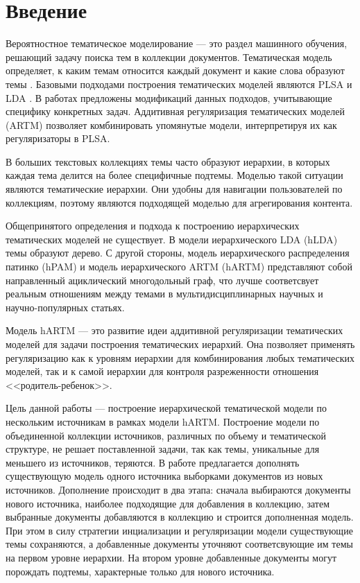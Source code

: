\chapter{Введение}
Вероятностное тематическое моделирование --- это  раздел машинного обучения, решающий задачу поиска тем в коллекции документов. Тематическая модель определяет, к каким темам относится каждый документ и какие слова образуют темы \cite{Blei2012}. Базовыми подходами построения тематических моделей являются PLSA \cite{PLSA} и LDA \cite{LDA}. В работах \cite{extLDA1,extLDA2, extLDA3} предложены модификаций данных подходов, учитывающие специфику конкретных задач. Аддитивная регуляризация тематических
моделей (ARTM)\cite{ARTM1, ARTM2, ARTM3, ARTM4, Vorontsov2014} позволяет комбинировать упомянутые модели, интерпретируя их как регуляризаторы в PLSA. 


В больших текстовых коллекциях темы часто образуют иерархии, в которых каждая тема делится на более специфичные подтемы. Моделью такой ситуации являются тематические иерархии. Они удобны для навигации пользователей по коллекциям, поэтому являются подходящей моделью для агрегирования контента.

Общепринятого определения и подхода к построению иерархических тематических моделей не существует. В модели иерархического LDA (hLDA) \cite{hLDA} темы образуют дерево. С другой стороны, модель иерархического распределения патинко (hPAM)\cite{hPAM} и модель иерархического ARTM (hARTM) \cite{hARTM} представляют собой направленный ациклический многодольный граф, что лучше соответсвует реальным отношениям между темами в мультидисциплинарных научных и научно-популярных статьях.

Модель hARTM --- это развитие идеи аддитивной регуляризации тематических моделей для задачи построения тематических иерархий.
Она позволяет применять регуляризацию как к уровням иерархии для комбинирования любых тематических моделей, так и к самой иерархии для контроля разреженности отношения <<родитель-ребенок>>.

Цель данной работы --- построение иерархической тематической модели по нескольким источникам в рамках модели hARTM. Построение модели по объединенной коллекции источников, различных по объему и тематической структуре, не решает поставленной задачи, так как темы, уникальные для меньшего из источников, теряются. В работе предлагается дополнять существующую модель одного источника выборками документов из новых источников. Дополнение происходит в два этапа: сначала выбираются документы нового источника, наиболее подходящие для добавления в коллекцию, затем выбранные документы добавляются в коллекцию и строится дополненная модель. При этом в силу стратегии инциализации и регуляризации модели существующие темы сохраняются, а добавленные документы уточняют соответсвующие им темы на первом уровне иерархии. На втором уровне добавленные документы могут порождать подтемы, характерные только для нового источника. 

